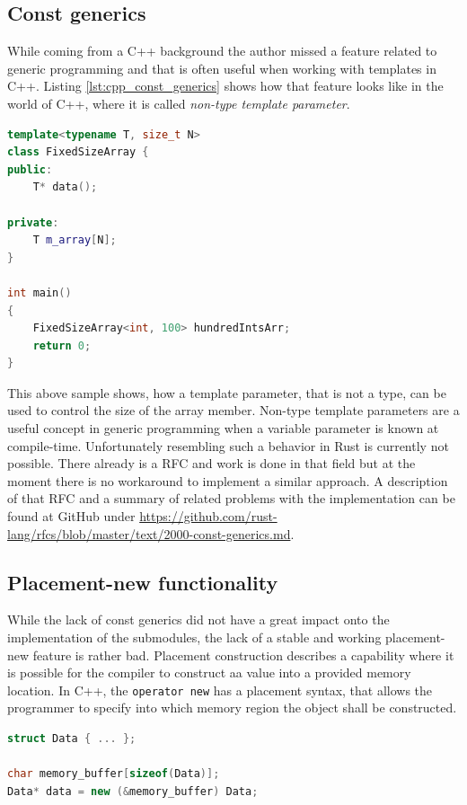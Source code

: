 \subsection{Const generics}

While coming from a C++ background the author missed a feature related to generic programming and that is often useful when working with templates in C++. Listing \ref{lst:cpp_const_generics} shows how that feature looks like in the world of C++, where it is called \textit{non-type template parameter}.\\

\begin{lstlisting}[caption={Showcasing template non-type parameters in C++}, label={lst:rust_generic_code}, language=C++]
template<typename T, size_t N>
class FixedSizeArray {
public:
	T* data();
	
private:
	T m_array[N];
}

int main() 
{
	FixedSizeArray<int, 100> hundredIntsArr;
	return 0;
}
\end{lstlisting}

\noindent
This above sample shows, how a template parameter, that is not a type, can be used to control the size of the array member. Non-type template parameters are a useful concept in generic programming when a variable parameter is known at compile-time. Unfortunately resembling such a behavior in Rust is currently not possible. There already is a \ac{RFC} and work is done in that field but at the moment there is no workaround to implement a similar approach. A description of that \ac{RFC} and a summary of related problems with the implementation can be found at GitHub under \url{https://github.com/rust-lang/rfcs/blob/master/text/2000-const-generics.md}.

\subsection{Placement-new functionality}

While the lack of const generics did not have a great impact onto the implementation of the submodules, the lack of a stable and working placement-new feature is rather bad. Placement construction describes a capability where it is possible for the compiler to construct aa value into a provided memory location. In C++, the \texttt{operator new} has a placement syntax, that allows the programmer to specify into which memory region the object shall be constructed.

\begin{lstlisting}[caption={Using placement-new to construct an object in a pre-allocated memory location}, label={lst:cpp_placement_new}, language=C++]
struct Data { ... };

char memory_buffer[sizeof(Data)];
Data* data = new (&memory_buffer) Data;
\end{lstlisting}

